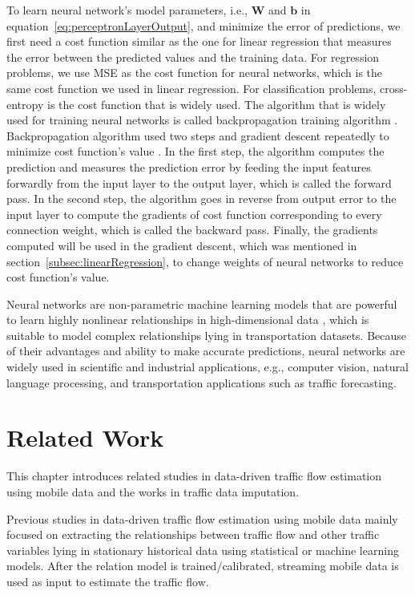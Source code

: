 \documentclass[english]{kththesis}
\begin{document}
To learn neural network's model parameters, i.e., $\mathbf{W}$ and $\mathbf{b}$ in equation~\ref{eq:perceptronLayerOutput}, and minimize the error of predictions, we first need a cost function similar as the one for linear regression that measures the error between the predicted values and the training data. For regression problems, we use MSE as the cost function for neural networks, which is the same cost function we used in linear regression. For classification problems, cross-entropy is the cost function that is widely used. The algorithm that is widely used for training neural networks is called backpropagation training algorithm \cite{rumelhart_back_propagation}. Backpropagation algorithm used two steps and gradient descent repeatedly to minimize cost function's value \cite{geron_handson_ml}. In the first step, the algorithm computes the prediction and measures the prediction error by feeding the input features forwardly from the input layer to the output layer, which is called the forward pass. In the second step, the algorithm goes in reverse from output error to the input layer to compute the gradients of cost function corresponding to every connection weight, which is called the backward pass. Finally, the gradients computed will be used in the gradient descent, which was mentioned in section~\ref{subsec:linearRegression}, to change weights of neural networks to reduce cost function's value.

Neural networks are non-parametric machine learning models that are powerful to learn highly nonlinear relationships in high-dimensional data \cite{vlahogianni_forecast_overview, ma_lstm_predict}, which is suitable to model complex relationships lying in transportation datasets. Because of their advantages and ability to make accurate predictions, neural networks are widely used in scientific and industrial applications, e.g., computer vision, natural language processing, and transportation applications such as traffic forecasting.

\chapter{Related Work}
\label{ch:relatedWorks}

This chapter introduces related studies in data-driven traffic flow estimation using mobile data and the works in traffic data imputation.

Previous studies in data-driven traffic flow estimation using mobile data mainly focused on extracting the relationships between traffic flow and other traffic variables lying in stationary historical data using statistical or machine learning models. After the relation model is trained/calibrated, streaming mobile data is used as input to estimate the traffic flow.
\end{document}
